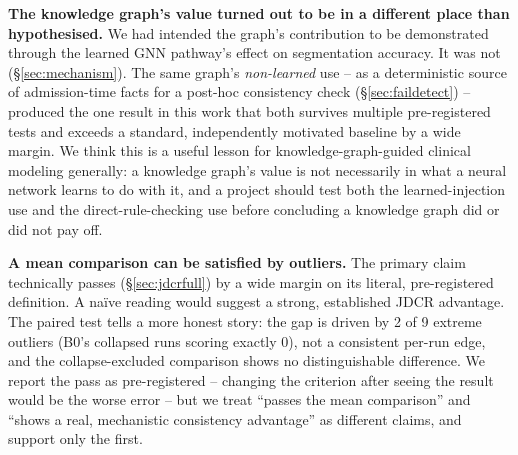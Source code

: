 \documentclass[conference]{IEEEtran}
\begin{document}
\textbf{The knowledge graph's value turned out to be in a different place than hypothesised.} We had intended the graph's contribution to be demonstrated through the learned GNN pathway's effect on segmentation accuracy. It was not (\S\ref{sec:mechanism}). The same graph's \emph{non-learned} use -- as a deterministic source of admission-time facts for a post-hoc consistency check (\S\ref{sec:faildetect}) -- produced the one result in this work that both survives multiple pre-registered tests and exceeds a standard, independently motivated baseline by a wide margin. We think this is a useful lesson for knowledge-graph-guided clinical modeling generally: a knowledge graph's value is not necessarily in what a neural network learns to do with it, and a project should test both the learned-injection use and the direct-rule-checking use before concluding a knowledge graph did or did not pay off.

\textbf{A mean comparison can be satisfied by outliers.} The primary claim technically passes (\S\ref{sec:jdcrfull}) by a wide margin on its literal, pre-registered definition. A na\"ive reading would suggest a strong, established JDCR advantage. The paired test tells a more honest story: the gap is driven by 2 of 9 extreme outliers (B0's collapsed runs scoring exactly 0), not a consistent per-run edge, and the collapse-excluded comparison shows no distinguishable difference. We report the pass as pre-registered -- changing the criterion after seeing the result would be the worse error -- but we treat ``passes the mean comparison'' and ``shows a real, mechanistic consistency advantage'' as different claims, and support only the first.
\end{document}
